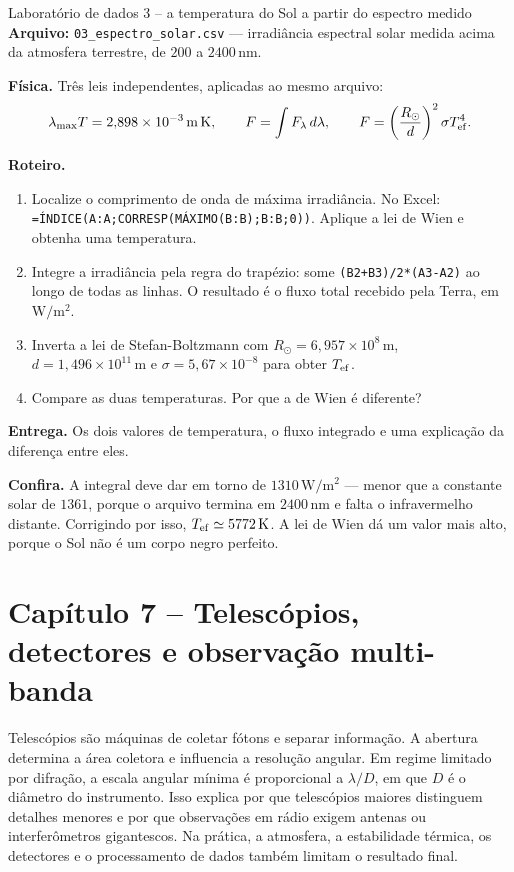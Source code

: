 \documentclass[11pt,a4paper]{article}
\begin{document}
\begin{lessonblock}[borderline west={2pt}{0pt}{astroGold}]{Laboratório de dados 3 -- a temperatura do Sol a partir do espectro medido}
\textbf{Arquivo:} \texttt{03\_espectro\_solar.csv} --- irradiância espectral solar medida acima da atmosfera terrestre, de $200$ a $2400\,\mathrm{nm}$.

\textbf{Física.} Três leis independentes, aplicadas ao mesmo arquivo:
\[
\lambda_{\max}T=2{,}898\times10^{-3}\,\mathrm{m\,K},\qquad
F=\int F_\lambda\,d\lambda,\qquad
F=\left(\frac{R_\odot}{d}\right)^{2}\sigma T_{\rm ef}^{4}.
\]

\textbf{Roteiro.}
\begin{enumerate}
\item Localize o comprimento de onda de máxima irradiância. No Excel: \texttt{=ÍNDICE(A:A;CORRESP(MÁXIMO(B:B);B:B;0))}. Aplique a lei de Wien e obtenha uma temperatura.
\item Integre a irradiância pela regra do trapézio: some \texttt{(B2+B3)/2*(A3-A2)} ao longo de todas as linhas. O resultado é o fluxo total recebido pela Terra, em $\mathrm{W/m^2}$.
\item Inverta a lei de Stefan-Boltzmann com $R_\odot=6{,}957\times10^{8}\,\mathrm{m}$, $d=1{,}496\times10^{11}\,\mathrm{m}$ e $\sigma=5{,}67\times10^{-8}$ para obter $T_{\rm ef}$.
\item Compare as duas temperaturas. Por que a de Wien é diferente?
\end{enumerate}

\textbf{Entrega.} Os dois valores de temperatura, o fluxo integrado e uma explicação da diferença entre eles.

\textbf{Confira.} A integral deve dar em torno de $1310\,\mathrm{W/m^2}$ --- menor que a constante solar de $1361$, porque o arquivo termina em $2400\,\mathrm{nm}$ e falta o infravermelho distante. Corrigindo por isso, $T_{\rm ef}\simeq5772\,\mathrm{K}$. A lei de Wien dá um valor mais alto, porque o Sol não é um corpo negro perfeito.
\end{lessonblock}

\newpage
\section*{Capítulo 7 -- Telescópios, detectores e observação multi-banda}
Telescópios são máquinas de coletar fótons e separar informação. A abertura determina a área coletora e influencia a resolução angular. Em regime limitado por difração, a escala angular mínima é proporcional a $\lambda/D$, em que $D$ é o diâmetro do instrumento. Isso explica por que telescópios maiores distinguem detalhes menores e por que observações em rádio exigem antenas ou interferômetros gigantescos. Na prática, a atmosfera, a estabilidade térmica, os detectores e o processamento de dados também limitam o resultado final.
\end{document}

